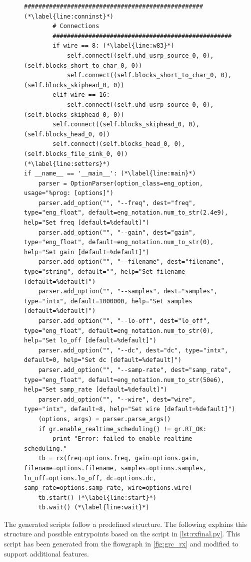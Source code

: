 \documentclass[12pt,a4paper,parskip=full,abstracton]{scrartcl}
\begin{document}
\begin{figure}[htbp]
\begin{lstlisting}[basicstyle=\tiny,caption={Generated RX flowgraph module with modifications ({\ttfamily rx\_final.py)}},label=lst:rxfinal.py]
        ################################################## (*\label{line:conninst}*)
        # Connections
        ##################################################
        if wire == 8: (*\label{line:w83}*)
            self.connect((self.uhd_usrp_source_0, 0), (self.blocks_short_to_char_0, 0))
            self.connect((self.blocks_short_to_char_0, 0), (self.blocks_skiphead_0, 0))
        elif wire == 16:
            self.connect((self.uhd_usrp_source_0, 0), (self.blocks_skiphead_0, 0))
        self.connect((self.blocks_skiphead_0, 0), (self.blocks_head_0, 0))
        self.connect((self.blocks_head_0, 0), (self.blocks_file_sink_0, 0))
(*\label{line:setters}*)
if __name__ == '__main__': (*\label{line:main}*)
    parser = OptionParser(option_class=eng_option, usage="%prog: [options]")
    parser.add_option("", "--freq", dest="freq", type="eng_float", default=eng_notation.num_to_str(2.4e9), help="Set freq [default=%default]")
    parser.add_option("", "--gain", dest="gain", type="eng_float", default=eng_notation.num_to_str(0), help="Set gain [default=%default]")
    parser.add_option("", "--filename", dest="filename", type="string", default="", help="Set filename [default=%default]")
    parser.add_option("", "--samples", dest="samples", type="intx", default=1000000, help="Set samples [default=%default]")
    parser.add_option("", "--lo-off", dest="lo_off", type="eng_float", default=eng_notation.num_to_str(0), help="Set lo_off [default=%default]")
    parser.add_option("", "--dc", dest="dc", type="intx", default=0, help="Set dc [default=%default]")
    parser.add_option("", "--samp-rate", dest="samp_rate", type="eng_float", default=eng_notation.num_to_str(50e6), help="Set samp_rate [default=%default]")
    parser.add_option("", "--wire", dest="wire", type="intx", default=8, help="Set wire [default=%default]")
    (options, args) = parser.parse_args()
    if gr.enable_realtime_scheduling() != gr.RT_OK:
        print "Error: failed to enable realtime scheduling."
    tb = rx(freq=options.freq, gain=options.gain, filename=options.filename, samples=options.samples, lo_off=options.lo_off, dc=options.dc, samp_rate=options.samp_rate, wire=options.wire)
    tb.start() (*\label{line:start}*)
    tb.wait() (*\label{line:wait}*)
    \end{lstlisting}
\end{figure}
The generated scripts follow a predefined structure. The following explains
this structure and possible entrypoints based on the script in
\cref{lst:rxfinal.py}. This script has been generated from the flowgraph
in \cref{fig:grc_rx} and modified to support additional features.
\end{document}
